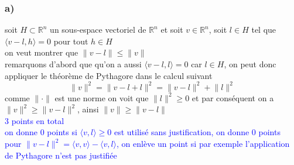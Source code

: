 \documentclass[11pt, a4paper, oneside]{article}
\begin{document}
\subsubsection*{a)}
soit $H\subset\mathbb{R}^n$ un sous-espace vectoriel de $\mathbb{R}^n$ et soit $v\in \mathbb{R}^n$, soit $l\in H$ tel que $\langle v-l, h\rangle = 0$ pour tout $h \in H$ \\
\text
on veut montrer que $\lVert v-l \rVert \leq \lVert v \rVert$ \\
remarquons d'abord que qu'on a aussi $\langle v-l,l \rangle = 0$ car $l \in H$, on peut donc appliquer le théorème de Pythagore dans le calcul suivant
$$\lVert v \rVert^2 = \lVert v-l + l \rVert^2 = \lVert v-l \rVert^2 + \lVert l \rVert^2$$
{\tiny comme $\lVert \cdot \rVert$ est une norme} on voit que $\lVert l \rVert^2 \geq 0$ et par conséquent on a $\lVert v \rVert^2 \geq \lVert v-l \rVert^2$, {\tiny ainsi $\lVert v \rVert \geq \lVert v-l \rVert$} \\
\textcolor{blue}{3 points en total \\ on donne 0 points si $\langle v,l \rangle \geq 0$ est utilisé sans justification, on donne 0 points pour $\lVert v-l \rVert^2 = \langle v,v \rangle - \langle v,l \rangle$, on enlève un point si par exemple l'application de Pythagore n'est pas justifiée}
\end{document}
